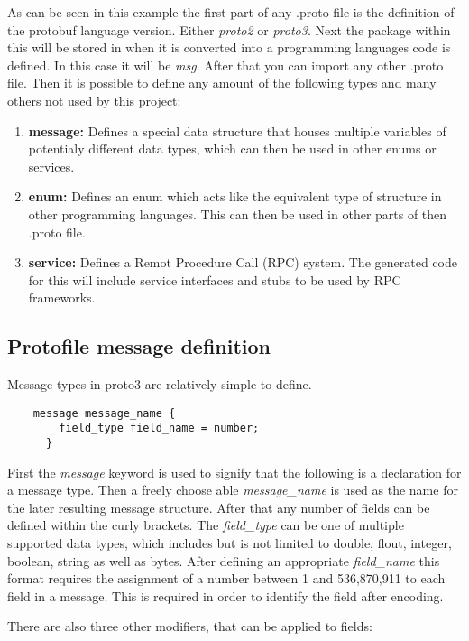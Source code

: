 As can be seen in this example the first part of any .proto file is the definition of the protobuf language version. Either \textit{proto2} or \textit{proto3}. Next the package within this will be 
stored in when it is converted into a programming languages code is defined. In this case it will be \textit{msg}. After that you can import any other .proto file.
Then it is possible to define any amount of the following types and many others not used by this project:
\begin{enumerate}
    \item \textbf{message:} Defines a special data structure that houses multiple variables of potentialy different data types, which can then be used in other enums or services.
    \item \textbf{enum:} Defines an enum which acts like the equivalent type of structure in other programming languages. This can then be used in other parts of then .proto file.
    \item \textbf{service:} Defines a Remot Procedure Call (RPC) system. The generated code for this will include service interfaces and stubs to be used by RPC frameworks.
\end{enumerate}

\subsection{Protofile message definition}

Message types in proto3 are relatively simple to define.

\begin{verbatim}
    message message_name {
        field_type field_name = number;
      }
\end{verbatim}

First the \textit{message} keyword is used to signify that the following is a declaration for a message type. Then a freely choose able \textit{message\_name} is 
used as the name for the later resulting message structure. After that any number of fields can be defined within the curly brackets. The \textit{field\_type} can be
one of multiple supported data types, which includes but is not limited to double, flout, integer, boolean, string as well as bytes. After defining an appropriate
\textit{field\_name} this format requires the assignment of a number between 1 and 536,870,911 to each field in a message. This is required in order to identify
the field after encoding.

There are also three other modifiers, that can be applied to fields:

